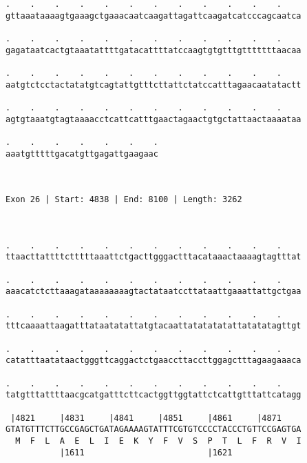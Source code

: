 \documentclass{article}
\begin{document}
\begin{Verbatim}
.    .    .    .    .    .    .    .    .    .    .    .    
gttaaataaaagtgaaagctgaaacaatcaagattagattcaagatcatcccagcaatca
                                                            
.    .    .    .    .    .    .    .    .    .    .    .    
gagataatcactgtaaatattttgatacattttatccaagtgtgtttgtttttttaacaa
                                                            
.    .    .    .    .    .    .    .    .    .    .    .    
aatgtctcctactatatgtcagtattgtttcttattctatccatttagaacaatatactt
                                                            
.    .    .    .    .    .    .    .    .    .    .    .    
agtgtaaatgtagtaaaacctcattcatttgaactagaactgtgctattaactaaaataa
                                                            
.    .    .    .    .    .    .
aaatgtttttgacatgttgagattgaagaac
                               
                               
 
Exon 26 | Start: 4838 | End: 8100 | Length: 3262



.    .    .    .    .    .    .    .    .    .    .    .    
ttaacttattttctttttaaattctgacttgggactttacataaactaaaagtagtttat
                                                            
.    .    .    .    .    .    .    .    .    .    .    .    
aaacatctcttaaagataaaaaaaagtactataatccttataattgaaattattgctgaa
                                                            
.    .    .    .    .    .    .    .    .    .    .    .    
tttcaaaattaagatttataatatattatgtacaattatatatatattatatatagttgt
                                                            
.    .    .    .    .    .    .    .    .    .    .    .    
catatttaatataactgggttcaggactctgaaccttaccttggagctttagaagaaaca
                                                            
.    .    .    .    .    .    .    .    .    .    .    .    
tatgtttattttaacgcatgatttcttcactggttggtattctcattgtttattcatagg
                                                            
 |4821     |4831     |4841     |4851     |4861     |4871    
GTATGTTTCTTGCCGAGCTGATAGAAAAGTATTTCGTGTCCCCTACCCTGTTCCGAGTGA
  M  F  L  A  E  L  I  E  K  Y  F  V  S  P  T  L  F  R  V  I
           |1611                         |1621              
  

\end{Verbatim}
\end{document}
